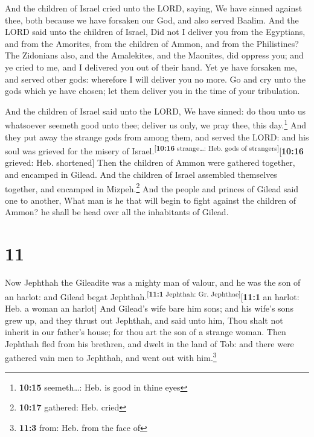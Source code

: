  And the children of Israel cried unto the LORD, saying,
We have sinned against thee, both because we have forsaken our God, and
also served Baalim.  And the LORD said unto the children
of Israel, Did not I deliver you from the Egyptians, and from the
Amorites, from the children of Ammon, and from the Philistines?
 The Zidonians also, and the Amalekites, and the
Maonites, did oppress you; and ye cried to me, and I delivered you out
of their hand.  Yet ye have forsaken me, and served other
gods: wherefore I will deliver you no more.  Go and cry
unto the gods which ye have chosen; let them deliver you in the time of
your tribulation.

 And the children of Israel said unto the LORD, We have
sinned: do thou unto us whatsoever seemeth good unto thee; deliver us
only, we pray thee, this day.\footnote{\textbf{10:15} seemeth\ldots:
  Heb. is good in thine eyes}  And they put away the
strange gods from among them, and served the LORD: and his soul was
grieved for the misery of Israel.\textsuperscript{{[}\textbf{10:16}
strange\ldots: Heb. gods of strangers{]}}{[}\textbf{10:16} grieved: Heb.
shortened{]}  Then the children of Ammon were gathered
together, and encamped in Gilead. And the children of Israel assembled
themselves together, and encamped in Mizpeh.\footnote{\textbf{10:17}
  gathered: Heb. cried}  And the people and princes of
Gilead said one to another, What man is he that will begin to fight
against the children of Ammon? he shall be head over all the inhabitants
of Gilead.

\hypertarget{section-10}{%
\section{11}\label{section-10}}

 Now Jephthah the Gileadite was a mighty man of valour,
and he was the son of an harlot: and Gilead begat
Jephthah.\textsuperscript{{[}\textbf{11:1} Jephthah: Gr.
Jephthae{]}}{[}\textbf{11:1} an harlot: Heb. a woman an harlot{]}
 And Gilead's wife bare him sons; and his wife's sons grew
up, and they thrust out Jephthah, and said unto him, Thou shalt not
inherit in our father's house; for thou art the son of a strange woman.
 Then Jephthah fled from his brethren, and dwelt in the
land of Tob: and there were gathered vain men to Jephthah, and went out
with him.\footnote{\textbf{11:3} from: Heb. from the face of}


